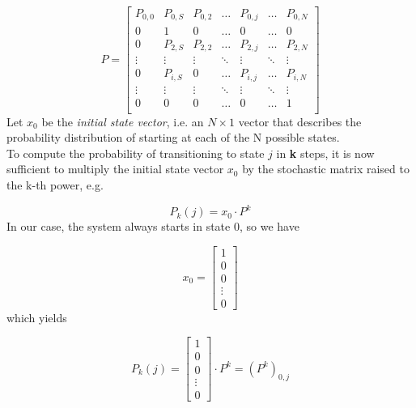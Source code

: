 \begin{equation*}
P = 
\begin{bmatrix}
P_{0,0}	& P_{0,S}	& P_{0,2}	& \dots  	& P_{0,j}	& \dots		& P_{0,N} \\
0		& 1			& 0			& \dots  	& 0			& \dots		& 0		 \\
0		& P_{2,S}	& P_{2,2}	& \dots  	& P_{2,j}	& \dots		& P_{2,N} \\
\vdots	& \vdots	& \vdots	& \ddots 	& \vdots	& \ddots	& \vdots \\
0		& P_{i,S}	& 0			& \dots		& P_{i,j}	& \dots		& P_{i,N} \\
\vdots	& \vdots	& \vdots	& \ddots	& \vdots	& \ddots	& \vdots \\
0		& 0			& 0			& \dots  	& 0			& \dots		& 1		 \\
\end{bmatrix}
\label{stochasticMatrix2}
\end{equation*}
\hfill \break
Let $x_{0}$ be the \textit{initial state vector}, i.e. an $N \times 1$ vector that describes the probability distribution of starting at each of the N possible states.\\
To compute the probability of transitioning to state $j$ in \textbf{k} steps, it is now sufficient to multiply the initial state vector $x_{0}$ by the stochastic matrix raised to the k-th power, e.g.

\begin{equation}\label{probAtStateK1}
P_{k}(j) = x_{0}\cdot P^{k}
\end{equation}
\hfill \break
In our case, the system always starts in state 0, so we have

\begin{equation*}
x_{0} = 
\begin{bmatrix}
1 \\
0 \\
0 \\
\vdots \\
0
\end{bmatrix}
\label{initialStateVector}
\end{equation*}
\hfill \break
which yields

\begin{equation}
P_{k}(j) = 
\begin{bmatrix}
1 \\
0 \\
0 \\
\vdots \\
0
\end{bmatrix}
\cdot P^{k} = (P^{k})_{0,j}
\label{eq:Pk_of_j}
\end{equation}
\hfill \break

